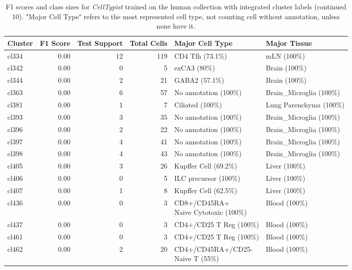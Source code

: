 \begin{table}[ht!]
\scriptsize
\caption[F1 scores and class sizes for \textit{CellTypist} trained on the human collection with integrated cluster labels (continued 10)]{F1 scores and class sizes for \textit{CellTypist} trained on the human collection with integrated cluster labels (continued 10). "Major Cell Type" refers to the most represented cell type, not counting cell without annotation, unless none have it.}
\centering
\label{table:tab_HAmodelclust10}
\begin{tabular}{lrrrll}
  \toprule
Cluster & F1 Score & Test Support & Total Cells & Major Cell Type & Major Tissue \\ 
  \midrule  
  cl334 & 0.00 &  12 & 119 & CD4 Tfh (73.1\%) & mLN (100\%) \\ 
  cl342 & 0.00 &   0 &   5 & exCA3 (80\%) & Brain (100\%) \\ 
  cl344 & 0.00 &   2 &  21 & GABA2 (57.1\%) & Brain (100\%) \\ 
  cl363 & 0.00 &   6 &  57 & No annotation (100\%) & Brain\_Microglia (100\%) \\ 
  cl381 & 0.00 &   1 &   7 & Ciliated (100\%) & Lung Parenchyma (100\%) \\ 
  cl393 & 0.00 &   3 &  35 & No annotation (100\%) & Brain\_Microglia (100\%) \\ 
  cl396 & 0.00 &   2 &  22 & No annotation (100\%) & Brain\_Microglia (100\%) \\ 
  cl397 & 0.00 &   4 &  41 & No annotation (100\%) & Brain\_Microglia (100\%) \\ 
  cl398 & 0.00 &   4 &  43 & No annotation (100\%) & Brain\_Microglia (100\%) \\ 
  cl405 & 0.00 &   3 &  26 & Kupffer Cell (69.2\%) & Liver (100\%) \\ 
  cl406 & 0.00 &   0 &   5 & ILC precursor (100\%) & Liver (100\%) \\ 
  cl407 & 0.00 &   1 &   8 & Kupffer Cell (62.5\%) & Liver (100\%) \\ 
  cl436 & 0.00 &   0 &   3 & \specialcell[t]{CD8+/CD45RA+\\Naive Cytotoxic (100\%)} & Blood (100\%) \\ 
  cl437 & 0.00 &   0 &   3 & CD4+/CD25 T Reg (100\%) & Blood (100\%) \\ 
  cl461 & 0.00 &   0 &   3 & CD4+/CD25 T Reg (100\%) & Blood (100\%) \\ 
  cl462 & 0.00 &   2 &  20 & \specialcell[t]{CD4+/CD45RA+/CD25-\\Naive T (55\%)} & Blood (100\%) \\ 

\end{tabular}
\end{table}
